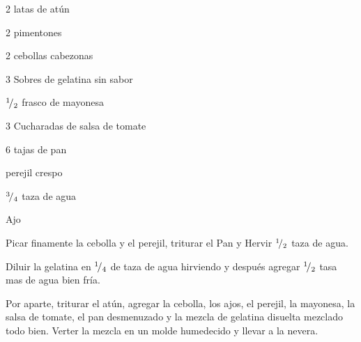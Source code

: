 


\begin{ingredientes}
\item 2 latas de atún
\item 2 pimentones
\item 2 cebollas cabezonas
\item 3 Sobres de gelatina sin sabor
\item ${}^{1}\!/_{2}$ frasco de mayonesa
\item 3 Cucharadas de salsa de tomate
\item 6 tajas de pan
\item perejil crespo
\item ${}^{3}\!/_{4}$ taza de agua
\item Ajo
\end{ingredientes}

\preparacion


Picar finamente la cebolla y el perejil, triturar el Pan y  Hervir ${}^{1}\!/_{2}$ taza de agua.

Diluir la gelatina en ${}^{1}\!/_{4}$ de taza de agua hirviendo y después agregar ${}^{1}\!/_{2}$ tasa mas de agua bien fría.

Por aparte, triturar el atún, agregar la cebolla, los ajos, el perejil, la mayonesa, la salsa de tomate, el pan desmenuzado y la mezcla de gelatina disuelta mezclado todo bien. Verter la mezcla en un molde humedecido y llevar a la nevera.
